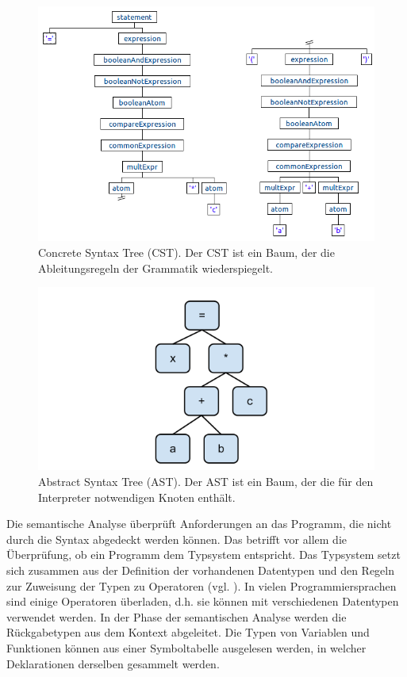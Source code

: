 \begin{figure}[h]
\includegraphics[width=\textwidth,scale=0.2]{figures/cst_beispiel.png}
\caption{Concrete Syntax Tree (CST). Der CST ist ein Baum, der die Ableitungsregeln der Grammatik wiederspiegelt.}
\label{abb_beispiel_cst}
\end{figure}

\begin{figure}[h]
\includegraphics[scale=0.5]{figures/ast_beispiel.png}
\begin{center}
\caption{Abstract Syntax Tree (AST). Der AST ist ein Baum, der die für den Interpreter notwendigen Knoten enthält.}
\end{center}

\label{abb_beispiel_ast}
\end{figure}

Die semantische Analyse überprüft Anforderungen an das Programm, die nicht durch die Syntax abgedeckt werden können. Das betrifft vor allem die Überprüfung, ob ein Programm dem Typsystem entspricht. Das Typsystem setzt sich zusammen aus der Definition der vorhandenen Datentypen und den Regeln zur Zuweisung der Typen zu Operatoren (vgl. \cite[S. 426]{AhSe86}). In vielen Programmiersprachen sind einige Operatoren überladen, d.h. sie können mit verschiedenen Datentypen verwendet werden. In der Phase der semantischen Analyse werden die Rückgabetypen aus dem Kontext abgeleitet. Die Typen von Variablen und Funktionen können aus einer Symboltabelle ausgelesen werden, in welcher Deklarationen derselben gesammelt werden.

